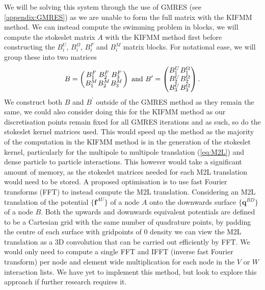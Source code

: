 We will be solving this system through the use of GMRES (see \cref{appendix:GMRES}) as we are unable to form the full matrix with the KIFMM method. We can instead compute the swimming problem in blocks, we will compute the stokeslet matrix $A$ with the KIFMM method first before constructing the $B_i^U$, $B_i^\Omega$, $B_i^F$ and $B_i^M$ matrix blocks. For notational ease, we will group these into two matrices
\begin{equation*}
\arraycolsep=0.4pt\def\arraystretch{1}
B = \left( \begin{array}{ccc}
B_{1}^{F} & B_{2}^{F} & B_{3}^{F} \\
B_{1}^{M} & B_{2}^{M} & B_{3}^{M}
\end{array}\right) \text{ and }
B^\prime = \left(\begin{array}{cc}
B_{1}^{U} & B_{1}^{\Omega} \\
B_{2}^{U} & B_{2}^{\Omega} \\
B_{3}^{U} & B_{3}^{\Omega} \\
\end{array}\right).
\end{equation*} 
We construct both $B$ and $B^\prime$ outside of the GMRES method as they remain the same, we could also consider doing this for the KIFMM method as our discretisation points remain fixed for all GMRES iterations and as such, so do the stokeslet kernel matrices used. This would speed up the method as the majority of the computation in the KIFMM method is in the generation of the stokeslet kernel, particularly for the multipole to multipole translation (\cref{eq:M2L}) and dense particle to particle interactions. This however would take a significant amount of memory, as the stokeslet matrices needed for each M2L translation would need to be stored. A proposed optimisation is to use fast Fourier transforms (FFT) to instead compute the M2L translation. Considering an M2L translation of the potential $\{\bm{f}^{AU}\}$ of a node $A$ onto the downwards surface $\{\bm{q}^{BD}\}$ of a node $B$. Both the upwards and downwards equivalent potentials are defined to be a Cartesian grid with the same number of quadrature points, by padding the centre of each surface with gridpoints of $0$ density we can view the M2L translation as a 3D convolution \cite{Ying2004} that can be carried out efficiently by FFT. We would only need to compute a single FFT and IFFT (inverse fast Fourier transform) per node and element wide multiplication for each node in the $V$ or $W$ interaction lists. We have yet to implement this method, but look to explore this approach if further research requires it.


